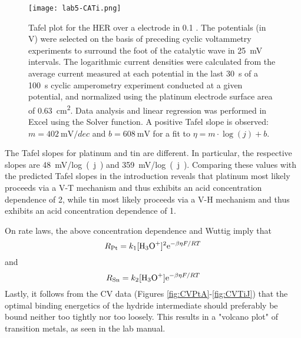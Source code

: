 \documentclass[../labs.tex]{subfiles}
\begin{document}
\begin{figure}[H]
    \centering
    \texttt{[image: lab5-CATi.png]}
    \caption{Tafel plot for the HER over a  electrode in \SI{0.1}{\molar} . The potentials (in \si{\volt}) were selected on the basis of preceding cyclic voltammetry experiments to surround the foot of the catalytic wave in \SI{25}{\milli\volt} intervals. The logarithmic current densities were calculated from the average current measured at each potential in the last \SI{30}{\second} of a \SI{100}{\second} cyclic amperometry experiment conducted at a given potential, and normalized using the platinum electrode surface area of \SI{0.63}{\centi\meter\squared}. Data analysis and linear regression was performed in Excel using the Solver function. A positive Tafel slope is observed: $m=\SI{402}{\milli\volt/dec}$ and $b=\SI{608}{\milli\volt}$ for a fit to $\eta=m\cdot\log(j)+b$.}
    \label{fig:CATi}
\end{figure}

The Tafel slopes for platinum and tin are different. In particular, the respective slopes are \SI{48}{\milli\volt/log(j)} and \SI{359}{\milli\volt/log(j)}. Comparing these values with the predicted Tafel slopes in the introduction reveals that platinum most likely proceeds via a V-T mechanism and thus exhibits an acid concentration dependence of 2, while tin most likely proceeds via a V-H mechanism and thus exhibits an acid concentration dependence of 1.\par
On rate laws, the above concentration dependence and Wuttig\supercite{bib:WuttigLecture} imply that
\begin{equation}
    R_{\ce{Pt}} = k_1[\ce{H3O+}]^2\e[-\beta\eta F/RT]
\end{equation}
and
\begin{equation}
    R_{\ce{Sn}} = k_2[\ce{H3O+}]\e[-\beta\eta F/RT]
\end{equation}
Lastly, it follows from the CV data (Figures \ref{fig:CVPtA}-\ref{fig:CVTiJ}) that the optimal binding energetics of the hydride intermediate should preferably be bound neither too tightly nor too loosely. This results in a "volcano plot" of transition metals, as seen in the lab manual\supercite{bib:LabManual2}.
\end{document}
